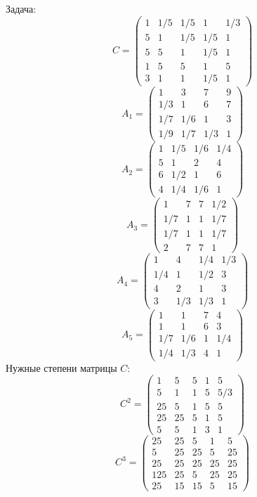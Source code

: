 Задача:
$$C= \begin{pmatrix}
1 & 1/5 & 1/5 & 1 & 1/3\\
5 & 1 & 1/5 & 1/5 & 1\\
5 & 5 & 1 & 1/5 & 1\\
1 & 5 & 5 & 1 & 5\\
3 & 1 & 1 & 1/5 & 1
\end{pmatrix}
$$
$$A_1= \begin{pmatrix}
1 & 3 & 7 & 9\\
1/3 & 1 & 6 & 7\\
1/7 & 1/6 & 1 & 3\\
1/9 & 1/7 & 1/3 & 1
\end{pmatrix}
$$
$$A_2= \begin{pmatrix}
1 & 1/5 & 1/6 & 1/4\\
5 & 1 & 2 & 4\\
6 & 1/2 & 1 & 6\\
4 & 1/4 & 1/6 & 1
\end{pmatrix}
$$
$$A_3= \begin{pmatrix}
1 & 7 & 7 & 1/2\\
1/7 & 1 & 1 & 1/7\\
1/7 & 1 & 1 & 1/7\\
2 & 7 & 7 & 1
\end{pmatrix}
$$
$$A_4= \begin{pmatrix}
1 & 4 & 1/4 & 1/3\\
1/4 & 1 & 1/2 & 3\\
4 & 2 & 1 & 3\\
3 & 1/3 & 1/3 & 1
\end{pmatrix}
$$
$$A_5= \begin{pmatrix}
1 & 1 & 7 & 4\\
1 & 1 & 6 & 3\\
1/7 & 1/6 & 1 & 1/4\\
1/4 & 1/3 & 4 & 1
\end{pmatrix}
$$
Нужные степени матрицы $C$:
$$C^2 = \begin{pmatrix}
1 & 5 & 5 & 1 & 5\\
5 & 1 & 1 & 5 & 5/3\\
25 & 5 & 1 & 5 & 5\\
25 & 25 & 5 & 1 & 5\\
5 & 5 & 1 & 3 & 1
\end{pmatrix}
$$
$$C^3 = \begin{pmatrix}
25 & 25 & 5 & 1 & 5\\
5 & 25 & 25 & 5 & 25\\
25 & 25 & 25 & 25 & 25\\
125 & 25 & 5 & 25 & 25\\
25 & 15 & 15 & 5 & 15
\end{pmatrix}
$$
